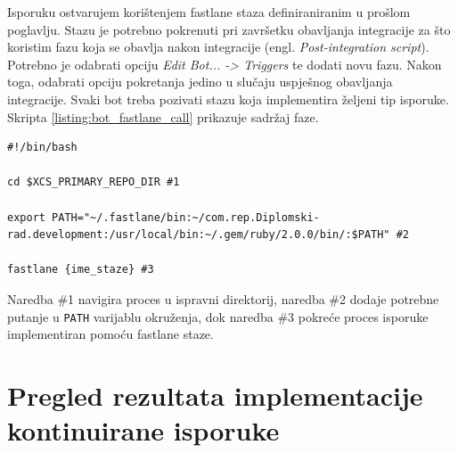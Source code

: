 \documentclass[times, utf8, diplomski, numeric]{fer}
\newcommand{\eng}[1]{(engl. \textit{#1})}
\begin{document}
Isporuku ostvarujem korištenjem fastlane staza definiraniranim u prošlom poglavlju. Stazu je potrebno pokrenuti pri završetku obavljanja integracije za što koristim fazu koja se obavlja nakon integracije \eng{Post-integration script}. Potrebno je odabrati opciju \textit{Edit Bot... -> Triggers} te dodati novu fazu. Nakon toga, odabrati opciju pokretanja jedino u slučaju uspješnog obavljanja integracije. Svaki bot treba pozivati stazu koja implementira željeni tip isporuke. Skripta \ref{listing:bot_fastlane_call} prikazuje sadržaj faze.

\begin{lstlisting}[caption=Sadržaj faze nakon obavljanja isporuke, label=listing:bot_fastlane_call]
#!/bin/bash

cd $XCS_PRIMARY_REPO_DIR #1

export PATH="~/.fastlane/bin:~/com.rep.Diplomski-rad.development:/usr/local/bin:~/.gem/ruby/2.0.0/bin/:$PATH" #2

fastlane {ime_staze} #3
\end{lstlisting}

Naredba \#1 navigira proces u ispravni direktorij, naredba \#2 dodaje potrebne putanje u \verb|PATH| varijablu okruženja, dok naredba \#3 pokreće proces isporuke implementiran pomoću fastlane staze.

\section{Pregled rezultata implementacije kontinuirane isporuke}
\end{document}
